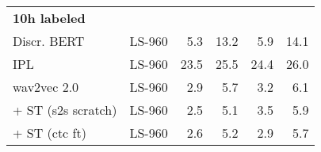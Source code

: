 \documentclass{article}
\newcommand{\wvpp}{wav2vec 2.0}
\newcommand{\librisz}{LS-960}
\begin{document}
\begin{table}[t]
\begin{tabular}{lcrrrr}
\midrule
\midrule
\multicolumn{6}{l}{\textbf{10h labeled}} \\
Discr. BERT~\cite{baevski2019effectiveness} & \librisz{} & 5.3 & 13.2 & 5.9 & 14.1 \\
IPL~\cite{xu2020iterative} & \librisz{} & 23.5 & 25.5 & 24.4 & 26.0 \\
\wvpp{}~\cite{baevski2020wav} & \librisz{} & 2.9 & 5.7 & 3.2 & 6.1 \\
\hspace{0.04in}+ ST (s2s scratch)  & \librisz{} & 2.5	& 5.1	& 3.5	& 5.9 \\
\hspace{0.04in}+ ST (ctc ft) & \librisz{} & 2.6 & 5.2 & 2.9 & 5.7 \\
\bottomrule
\end{tabular}
\end{table}
\end{document}
